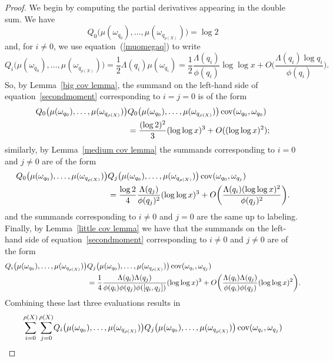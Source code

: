\documentclass[12pt,reqno]{amsart}
\theoremstyle{definition}
\newcommand{\cov}{\mathop{\rm cov}\nolimits}
\begin{document}
\begin{proof}
We begin by computing the partial derivatives appearing in the double sum. We have
\[
Q_0 \big( \mu(\omega_{q_0}),\dots,\mu(\omega_{q_{\rho(X)}}) \big) = \log 2
\]
and, for $i \neq 0$, we use equation~(\ref{muomegaq}) to write
\[
Q_i \big( \mu(\omega_{q_0}),\dots,\mu(\omega_{q_{\rho(X)}}) \big) = \frac{1}{2}\Lambda(q_i)\mu(\omega_{q_i}) = \frac{1}{2} \frac{\Lambda(q_i)}{\phi(q_i)} \log\log x + O\bigg(\frac{\Lambda(q_i) \log q_i}{\phi(q_i)} \bigg).
\]
So, by Lemma~\ref{big cov lemma}, the summand on the left-hand side of equation~\eqref{secondmoment} corresponding to $i = j = 0$ is of the form
\begin{align*}
Q_0 \big( \mu(\omega_{q_0}),\dots,\mu(\omega_{q_{\rho(X)}}) \big) & Q_0 \big( \mu(\omega_{q_0}),\dots,\mu(\omega_{q_{\rho(X)}}) \big) \cov(\omega_{q_0}, \omega_{q_0}) \\
&= \frac{(\log 2)^2}{3}(\log\log x)^3 + O((\log\log x)^2);
\end{align*}
similarly, by Lemma~\ref{medium cov lemma} the summands corresponding to $i = 0$ and $j \neq 0$ are of the form
\begin{align*}
Q_0 \big( \mu(\omega_{q_0}),\dots,\mu(\omega_{q_{\rho(X)}}) \big) & Q_j \big( \mu(\omega_{q_0}),\dots,\mu(\omega_{q_{\rho(X)}}) \big) \cov(\omega_{q_0}, \omega_{q_j}) \\
&= \frac{\log 2}{4}\frac{\Lambda(q_j)}{\phi(q_j)^2}(\log\log x)^3 + O\bigg(\frac{\Lambda(q_i)(\log\log x)^2}{\phi(q_j)^2}\bigg).
\end{align*}
and the summands corresponding to $i \neq 0$ and $j = 0$ are the same up to labeling. Finally, by Lemma~\ref{little cov lemma} we have that the summands on the left-hand side of equation~\eqref{secondmoment} corresponding to $i \neq 0$ and $j \neq 0$ are of the form
\begin{align*}
Q_i \big( \mu(\omega_{q_0}),\dots,\mu(\omega_{q_{\rho(X)}}) \big) & Q_j \big( \mu(\omega_{q_0}),\dots,\mu(\omega_{q_{\rho(X)}}) \big) \cov(\omega_{q_i}, \omega_{q_j}) \\
&= \frac{1}{4}\frac{\Lambda(q_i)\Lambda(q_j)}{\phi(q_i)\phi(q_j)\phi([q_i, q_j])}(\log\log x)^3 + O\bigg(\frac{\Lambda(q_i)\Lambda(q_j)}{\phi(q_i)\phi(q_j)}(\log\log x)^2\bigg).
\end{align*}
Combining these last three evaluations results in
\begin{align}
\sum_{i=0}^{\rho(X)} \sum_{j=0}^{\rho(X)} & Q_i \big( \mu(\omega_{q_0}),\dots,\mu(\omega_{q_{\rho(X)}}) \big) Q_j\big( \mu(\omega_{q_0}),\dots,\mu(\omega_{q_{\rho(X)}}) \big) \cov(\omega_{q_i},\omega_{q_j}) \nonumber \\

\end{align}
\end{proof}
\end{document}
